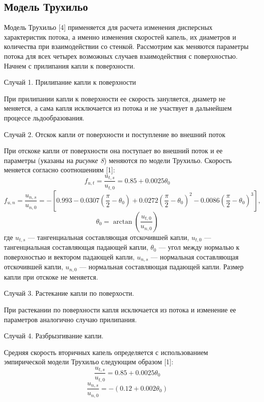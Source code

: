 \subsection{Модель Трухильо}

Модель Трухильо [4] применяется для расчета изменения дисперсных характеристик потока, а именно изменения скоростей капель, их диаметров и количества при взаимодействии со стенкой. Рассмотрим как меняются параметры потока для всех четырех возможных случаев взаимодействия с поверхностью. Начнем с прилипания капли к поверхности.

\noindent Случай 1. Прилипание капли к поверхности

При прилипании капли к поверхности ее скорость зануляется, диаметр не меняется, а сама капля исключается из потока и не участвует в дальнейшем процессе льдообразования.

\noindent Случай 2. Отскок капли от поверхности и поступление во внешний поток

При отскоке капли от поверхности она поступает во внешний поток и ее параметры (указаны на \textit{рисунке 8}) меняются по модели Трухильо. Скорость меняется согласно соотношениям [1]:
\begin{equation}
	f_{u,t} = \frac{u_{t,s}}{u_{t,0}} = 0.85+0.0025\theta_0
\end{equation}
\begin{equation}
	f_{u,n} = \frac{u_{n,s}}{u_{n,0}} = -\left[0.993-0.0307\left(\frac{\pi}{2}-\theta_0\right)+0.0272\left(\frac{\pi}{2}-\theta_0\right)^2-0.0086\left(\frac{\pi}{2}-\theta_0\right)^3\right],
\end{equation}
\begin{equation*}
	\theta_0 = \arctan\left(\frac{u_{t,0}}{u_{n,0}}\right)
\end{equation*}
где $u_{t,s}$ --- тангенциальная составляющая отскочившей капли, $u_{t,0}$ --- тангенциальная составляющая падающей капли, $\theta_0$ --- угол между нормалью к поверхностью и вектором падающей капли, $u_{n,s}$ --- нормальная составляющая отскочившей капли, $u_{n,0}$ --- нормальная составляющая падающей капли. Размер капли при отскоке не меняется. 

\noindent Случай 3. Растекание капли по поверхости.

При растекании по поверхности капля исключается из потока и изменение ее параметров аналогично случаю прилипания.

\noindent Случай 4. Разбрызгивание капли.

Средняя скорость вторичных капель определяется с использованием эмпирической модели Трухильо следующим образом [1]:
\begin{equation}
	\frac{u_{t,s}}{u_{t,0}} = 0.85+0.0025\theta_0
\end{equation}
\begin{equation}
	\frac{u_{n,s}}{u_{n,0}} = -(0.12+0.002\theta_0)
\end{equation}

